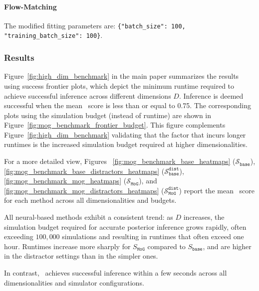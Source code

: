 \paragraph{Flow-Matching}
The modified fitting parameters are:
\texttt{\{"batch\_size": 100, "training\_batch\_size": 100\}}.

\subsubsection{Results}

Figure~\ref{fig:high_dim_benchmark} in the main paper summarizes the results using success frontier plots, which depict the minimum runtime required to achieve successful inference across different dimensions $D$. 
Inference is deemed successful when the mean \CtwoST~score is less than or equal to 0.75. 
The corresponding plots using the simulation budget (instead of runtime) are shown in Figure~\ref{fig:mog_benchmark_frontier_budget}. 
This figure complements Figure~\ref{fig:high_dim_benchmark} validating that the factor that incurs longer runtimes is the increased simulation budget required at higher dimensionalities.

For a more detailed view, Figures~%
\ref{fig:mog_benchmark_base_heatmaps} ($\mathcal{S}_{\mathtt{base}}$), 
\ref{fig:mog_benchmark_base_distractors_heatmaps} ($\mathcal{S}_{\mathtt{base}}^{\mathtt{dist}}$), 
\ref{fig:mog_benchmark_mog_heatmaps} ($\mathcal{S}_{\mathtt{MoG}}$), and 
\ref{fig:mog_benchmark_mog_distractors_heatmaps} ($\mathcal{S}_{\mathtt{MoG}}^{\mathtt{dist}}$) 
report the mean \CtwoST~score for each method across all dimensionalities and budgets.

All neural-based methods exhibit a consistent trend: as $D$ increases, the simulation budget required for accurate posterior inference grows rapidly, often exceeding $100{,}000$ simulations and resulting in runtimes that often exceed one hour. 
Runtimes increase more sharply for $S_{\mathtt{MoG}}$ compared to $S_{\mathtt{base}}$, and are higher in the distractor settings than in the simpler ones. 

In contrast, \rromc~achieves successful inference within a few seconds across all dimensionalities and simulator configurations.


